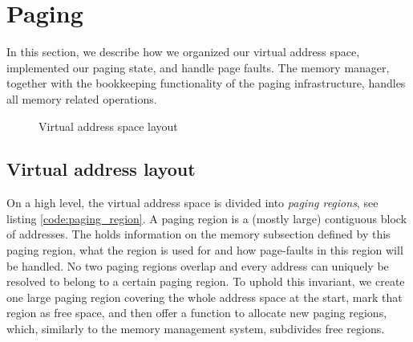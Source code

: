 \section{Paging}\label{paging}

In this section, we describe how we organized our virtual address space, implemented our paging state, and handle page faults. The memory manager, together with the bookkeeping functionality of the paging infrastructure, handles all memory related operations.


    \begin{figure}[hbt!]
        \centering
        \scalebox{0.6}{
            
        }

        \caption{Virtual address space layout}
        \label{fig:virtual_address_layout}
    \end{figure}



\subsection{Virtual address layout}
On a high level, the virtual address space is divided into \textit{paging regions}, see listing \ref{code:paging_region}. A paging region is a (mostly large) contiguous block of addresses. The  holds information on the memory subsection defined by this paging region, what the region is used for and how page-faults in this region will be handled. No two paging regions overlap and every address can uniquely be resolved to
belong to a certain paging region. To uphold this invariant, we create one large paging region covering the whole address space at the start, mark that region as free space, and then offer a function to allocate new paging regions, which, similarly to the memory management system, subdivides free regions.

